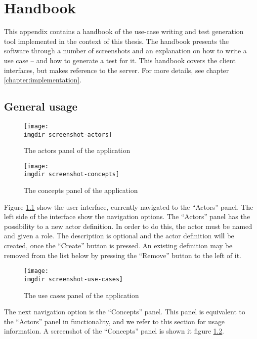 \chapter{Handbook}
\label{appendix:handbook}
This appendix contains a handbook of the use-case writing and test generation tool implemented in the context of this thesis. The handbook presents the software through a number of screenshots and an explanation on how to write a use case -- and how to generate a test for it. This handbook covers the client interfaces, but makes reference to the server. For more details, see chapter \ref{chapter:implementation}.

\section{General usage}

\begin{figure}[!htbp]
  \centering
  \texttt{[image: \\imgdir screenshot-actors]}
  \caption{The actors panel of the application}
\label{fig:screenshot-actors}
\end{figure}

\begin{figure}[!htbp]
  \centering
  \texttt{[image: \\imgdir screenshot-concepts]}
  \caption{The concepts panel of the application}
\label{fig:screenshot-concepts}
\end{figure}

\noindent Figure \ref{fig:screenshot-actors} show the user interface, currently navigated to the ``Actors'' panel. The left side of the interface show the navigation options. The ``Actors'' panel has the possibility to a new actor definition. In order to do this, the actor must be named and given a role. The description is optional and the actor definition will be created, once the ``Create'' button is pressed. An existing definition may be removed from the list below by pressing the ``Remove'' button to the left of it. \medskip

\begin{figure}[!htbp]
  \centering
  \texttt{[image: \\imgdir screenshot-use-cases]}
  \caption{The use cases panel of the application}
\label{fig:screenshot-use-cases}
\end{figure}

\noindent The next navigation option is the ``Concepts'' panel. This panel is equivalent to the ``Actors'' panel in functionality, and we refer to this section for usage information. A screenshot of the ``Concepts'' panel is shown it figure \ref{fig:screenshot-concepts}.\medskip

